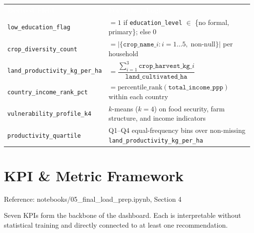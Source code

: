\documentclass[11pt,a4paper]{article}
\newcommand{\tH}[1]{\cellcolor{rhoRed}\textcolor{white}{\textbf{#1}}}
\newcommand{\nb}[1]{\vspace{2pt}\begin{refbox}Reference: #1\end{refbox}\vspace{3pt}}
\begin{document}
\begin{tabularx}{\linewidth}{@{}p{5.0cm} L@{}}
  \tH{Derived Field} & \tH{Formula / Logic} \\
  \texttt{low\_education\_flag}            & $= 1$ if \texttt{education\_level} $\in$ \{no formal, primary\}; else $0$ \\
  \texttt{crop\_diversity\_count}          & $= |\{\texttt{crop\_name\_}i : i=1\ldots5,\; \text{non-null}\}|$ per household \\
  \texttt{land\_productivity\_kg\_per\_ha} & $= \dfrac{\sum_{i=1}^{3}\texttt{crop\_harvest\_kg\_}i}{\texttt{land\_cultivated\_ha}}$ \\
  \texttt{country\_income\_rank\_pct}      & $= \text{percentile\_rank}(\texttt{total\_income\_ppp})$ within each country \\
  \texttt{vulnerability\_profile\_k4}     & $k$-means ($k=4$) on food security, farm structure, and income indicators \\
  \texttt{productivity\_quartile}          & Q1--Q4 equal-frequency bins over non-missing \texttt{land\_productivity\_kg\_per\_ha} \\
  \bottomrule
\end{tabularx}

\newpage

\section{KPI \& Metric Framework}

\nb{notebooks/05\_final\_load\_prep.ipynb, Section 4}

Seven KPIs form the backbone of the dashboard. Each is interpretable without statistical training and directly connected to at least one recommendation.
\end{document}
